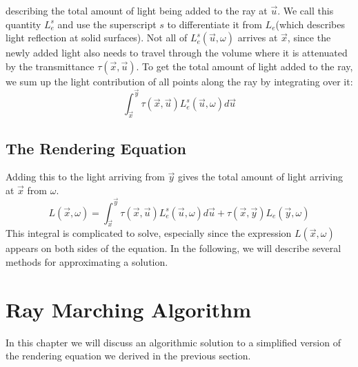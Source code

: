 describing the total amount of light being added to the ray at $\vec{u}$. We call this quantity $L_e^s$ and use the superscript $s$ to differentiate it from $L_e$(which describes light reflection at solid surfaces).
Not all of $L_e^s(\vec{u}, \omega )$ arrives at $\vec{x}$, since the newly added light also needs to travel through the volume where it is attenuated by the transmittance $\tau (\vec{x}, \vec{u})$.
To get the total amount of light added to the ray, we sum up the light contribution of all points along the ray by integrating over it\cite{zhou2007real-time}:
\begin{equation}
\int_{\vec{x}}^{\vec{y}} \tau(\vec{x}, \vec{u})L_e^s(\vec{u}, \omega )d\vec{u}
\end{equation}
\subsection{The Rendering Equation}
Adding this to the light arriving from $\vec{y}$ gives the total amount of light arriving at $\vec{x}$ from $\omega $.
\begin{equation}
L(\vec{x}, \omega ) = {\int_{\vec{x}}^{\vec{y}} \tau(\vec{x}, \vec{u})L_e^s(\vec{u}, \omega )d\vec{u}} + \tau(\vec{x}, \vec{y}) L_e(\vec{y}, \omega )
\end{equation}
This integral is complicated to solve, especially since the expression $L(\vec{x}, \omega )$ appears on both sides of the equation.
In the following, we will describe several methods for approximating a solution.




\section{Ray Marching Algorithm}
In this chapter we will discuss an algorithmic solution\cite{511, 10.1145/147130.147155} to a simplified version of the rendering equation we derived in the previous section.
